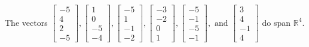 \begin{exercise}
\begin{exerciseStatement}
  \end{exerciseStatement}
  \begin{exerciseAnswer}
   The vectors \(\left[\begin{array}{r}
-5 \\
4 \\
2 \\
-5
\end{array}\right] , \left[\begin{array}{r}
1 \\
0 \\
-5 \\
-4
\end{array}\right] , \left[\begin{array}{r}
-5 \\
1 \\
-1 \\
-2
\end{array}\right] , \left[\begin{array}{r}
-3 \\
-2 \\
0 \\
1
\end{array}\right] , \left[\begin{array}{r}
-5 \\
-1 \\
-5 \\
-1
\end{array}\right] , \text{ and } \left[\begin{array}{r}
3 \\
4 \\
-1 \\
4
\end{array}\right]\) 
  	 do  
	span \(\mathbb{R}^4\).
  


  \end{exerciseAnswer}
\end{exercise}